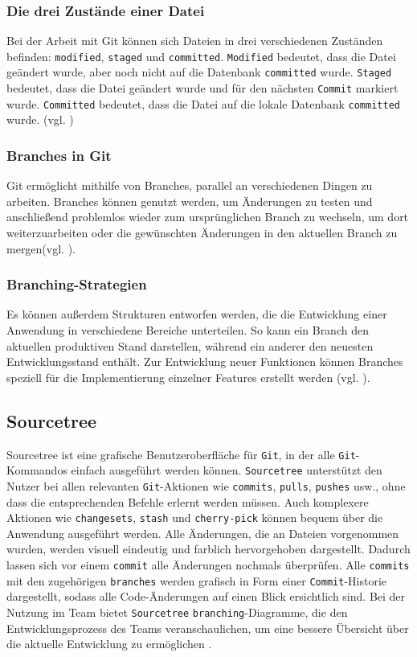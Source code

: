 \documentclass[oneside]{ausarbeitung}
\begin{document}
\subsubsection{Die drei Zustände einer Datei}
Bei der Arbeit mit Git können sich Dateien in drei verschiedenen Zuständen befinden: \texttt{modified}, \texttt{staged} und \texttt{committed}.  
\texttt{Modified} bedeutet, dass die Datei geändert wurde, aber noch nicht auf die Datenbank \texttt{committed} wurde.  
\texttt{Staged} bedeutet, dass die Datei geändert wurde und für den nächsten \texttt{Commit} markiert wurde.  
\texttt{Committed} bedeutet, dass die Datei auf die lokale Datenbank \texttt{committed} wurde.
(vgl. \parencite{what is git?})

\subsubsection{Branches in Git}
Git ermöglicht mithilfe von Branches, parallel an verschiedenen Dingen zu arbeiten. Branches können genutzt werden, um Änderungen zu testen und anschließend problemlos wieder zum ursprünglichen Branch zu wechseln, um dort weiterzuarbeiten oder die gewünschten Änderungen in den aktuellen Branch zu mergen(vgl. \parencite{git branching and merging}).  

\subsubsection{Branching-Strategien}
Es können außerdem Strukturen entworfen werden, die die Entwicklung einer Anwendung in verschiedene Bereiche unterteilen. So kann ein Branch den aktuellen produktiven Stand darstellen, während ein anderer den neuesten Entwicklungsstand enthält. Zur Entwicklung neuer Funktionen können Branches speziell für die Implementierung einzelner Features erstellt werden (vgl. \parencite{git branching and merging}).


\subsection{Sourcetree}
Sourcetree ist eine grafische Benutzeroberfläche für \texttt{Git}, in der alle \texttt{Git}-Kommandos einfach ausgeführt werden können. \texttt{Sourcetree} unterstützt den Nutzer bei allen relevanten \texttt{Git}-Aktionen wie \texttt{commits}, \texttt{pulls}, \texttt{pushes} usw., ohne dass die entsprechenden Befehle erlernt werden müssen. Auch komplexere Aktionen wie \texttt{changesets}, \texttt{stash} und \texttt{cherry-pick} können bequem über die Anwendung ausgeführt werden.
Alle Änderungen, die an Dateien vorgenommen wurden, werden visuell eindeutig und farblich hervorgehoben dargestellt. Dadurch lassen sich vor einem \texttt{commit} alle Änderungen nochmals überprüfen.
Alle \texttt{commits} mit den zugehörigen \texttt{branches} werden grafisch in Form einer \texttt{Commit}-Historie dargestellt, sodass alle Code-Änderungen auf einen Blick ersichtlich sind.
Bei der Nutzung im Team bietet \texttt{Sourcetree} \texttt{branching}-Diagramme, die den Entwicklungsprozess des Teams veranschaulichen, um eine bessere Übersicht über die aktuelle Entwicklung zu ermöglichen \parencite{sourcetree}. 
\end{document}
